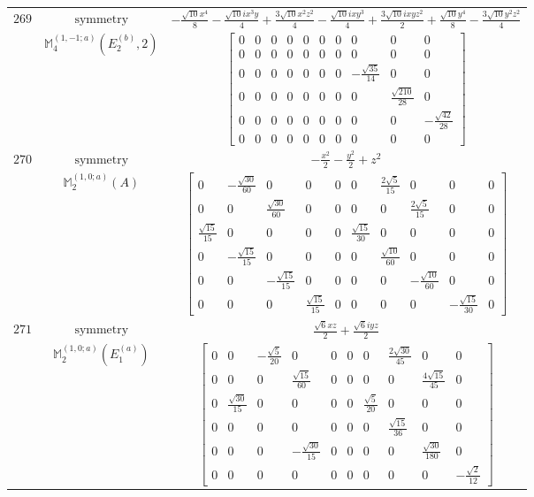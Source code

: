 \documentclass[fleqn,8pt,landscape]{jsarticle}
\begin{document}
\begin{longtable}{ccc}
$ 269 $ & $ \text{symmetry} $ & $ - \frac{\sqrt{10} x^{4}}{8} - \frac{\sqrt{10} i x^{3} y}{4} + \frac{3 \sqrt{10} x^{2} z^{2}}{4} - \frac{\sqrt{10} i x y^{3}}{4} + \frac{3 \sqrt{10} i x y z^{2}}{2} + \frac{\sqrt{10} y^{4}}{8} - \frac{3 \sqrt{10} y^{2} z^{2}}{4} $ \\
$  $ & $ \mathbb{M}_{4}^{(1,-1;a)}(E_{2}^{(b)},2) $ & $ \begin{bmatrix} 0 & 0 & 0 & 0 & 0 & 0 & 0 & 0 & 0 & 0 \\ 0 & 0 & 0 & 0 & 0 & 0 & 0 & 0 & 0 & 0 \\ 0 & 0 & 0 & 0 & 0 & 0 & 0 & - \frac{\sqrt{35}}{14} & 0 & 0 \\ 0 & 0 & 0 & 0 & 0 & 0 & 0 & 0 & \frac{\sqrt{210}}{28} & 0 \\ 0 & 0 & 0 & 0 & 0 & 0 & 0 & 0 & 0 & - \frac{\sqrt{42}}{28} \\ 0 & 0 & 0 & 0 & 0 & 0 & 0 & 0 & 0 & 0 \end{bmatrix} $ \\ \hline
$ 270 $ & $ \text{symmetry} $ & $ - \frac{x^{2}}{2} - \frac{y^{2}}{2} + z^{2} $ \\
$  $ & $ \mathbb{M}_{2}^{(1,0;a)}(A) $ & $ \begin{bmatrix} 0 & - \frac{\sqrt{30}}{60} & 0 & 0 & 0 & 0 & \frac{2 \sqrt{5}}{15} & 0 & 0 & 0 \\ 0 & 0 & \frac{\sqrt{30}}{60} & 0 & 0 & 0 & 0 & \frac{2 \sqrt{5}}{15} & 0 & 0 \\ \frac{\sqrt{15}}{15} & 0 & 0 & 0 & 0 & \frac{\sqrt{15}}{30} & 0 & 0 & 0 & 0 \\ 0 & - \frac{\sqrt{15}}{15} & 0 & 0 & 0 & 0 & \frac{\sqrt{10}}{60} & 0 & 0 & 0 \\ 0 & 0 & - \frac{\sqrt{15}}{15} & 0 & 0 & 0 & 0 & - \frac{\sqrt{10}}{60} & 0 & 0 \\ 0 & 0 & 0 & \frac{\sqrt{15}}{15} & 0 & 0 & 0 & 0 & - \frac{\sqrt{15}}{30} & 0 \end{bmatrix} $ \\ \hline
$ 271 $ & $ \text{symmetry} $ & $ \frac{\sqrt{6} x z}{2} + \frac{\sqrt{6} i y z}{2} $ \\
$  $ & $ \mathbb{M}_{2}^{(1,0;a)}(E_{1}^{(a)}) $ & $ \begin{bmatrix} 0 & 0 & - \frac{\sqrt{5}}{20} & 0 & 0 & 0 & 0 & \frac{2 \sqrt{30}}{45} & 0 & 0 \\ 0 & 0 & 0 & \frac{\sqrt{15}}{60} & 0 & 0 & 0 & 0 & \frac{4 \sqrt{15}}{45} & 0 \\ 0 & \frac{\sqrt{30}}{15} & 0 & 0 & 0 & 0 & \frac{\sqrt{5}}{20} & 0 & 0 & 0 \\ 0 & 0 & 0 & 0 & 0 & 0 & 0 & \frac{\sqrt{15}}{36} & 0 & 0 \\ 0 & 0 & 0 & - \frac{\sqrt{30}}{15} & 0 & 0 & 0 & 0 & \frac{\sqrt{30}}{180} & 0 \\ 0 & 0 & 0 & 0 & 0 & 0 & 0 & 0 & 0 & - \frac{\sqrt{2}}{12} \end{bmatrix} $ \\ \hline

\end{longtable}
\end{document}
